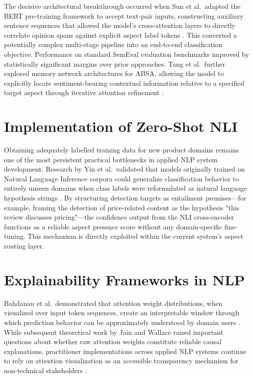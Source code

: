 \documentclass[12pt,a4paper]{report}
\begin{document}
The decisive architectural breakthrough occurred when Sun et al.\ adapted the BERT pre-training framework to accept text-pair inputs, constructing auxiliary sentence sequences that allowed the model's cross-attention layers to directly correlate opinion spans against explicit aspect label tokens \cite{sun2019utilizing}. This converted a potentially complex multi-stage pipeline into an end-to-end classification objective. Performance on standard SemEval evaluation benchmarks improved by statistically significant margins over prior approaches. Tang et al.\ further explored memory network architectures for ABSA, allowing the model to explicitly locate sentiment-bearing contextual information relative to a specified target aspect through iterative attention refinement \cite{tang2016aspect}.

\section{Implementation of Zero-Shot NLI}
Obtaining adequately labelled training data for new product domains remains one of the most persistent practical bottlenecks in applied NLP system development. Research by Yin et al.\ validated that models originally trained on Natural Language Inference corpora could generalize classification behavior to entirely unseen domains when class labels were reformulated as natural language hypothesis strings \cite{yin2019zero}. By structuring detection targets as entailment premises—for example, framing the detection of price-related content as the hypothesis "this review discusses pricing"—the confidence output from the NLI cross-encoder functions as a reliable aspect presence score without any domain-specific fine-tuning. This mechanism is directly exploited within the current system's aspect routing layer.

\section{Explainability Frameworks in NLP}
Bahdanau et al.\ demonstrated that attention weight distributions, when visualized over input token sequences, create an interpretable window through which prediction behavior can be approximately understood by domain users \cite{bahdanau2015neural}. While subsequent theoretical work by Jain and Wallace raised important questions about whether raw attention weights constitute reliable causal explanations, practitioner implementations across applied NLP systems continue to rely on attention visualization as an accessible transparency mechanism for non-technical stakeholders \cite{jain2019attention}.
\end{document}
